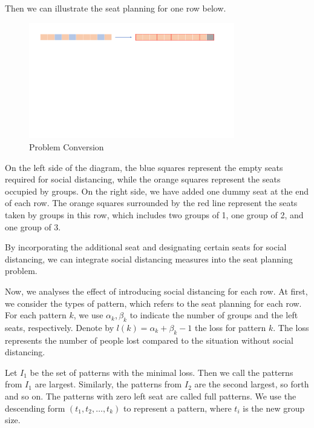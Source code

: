 Then we can illustrate the seat planning for one row below. 

\begin{figure}[ht]
    \centering
    \includegraphics[width = 0.8\textwidth]{./Figures/dummy_seat.pdf}
    \caption{Problem Conversion}
\end{figure}


On the left side of the diagram, the blue squares represent the empty seats required for social distancing, while the orange squares represent the seats occupied by groups. On the right side, we have added one dummy seat at the end of each row. The orange squares surrounded by the red line represent the seats taken by groups in this row, which includes two groups of 1, one group of 2, and one group of 3.

By incorporating the additional seat and designating certain seats for social distancing, we can integrate social distancing measures into the seat planning problem.


Now, we analyses the effect of introducing social distancing for each row. At first, we consider the types of pattern, which refers to the seat planning for each row. For each pattern $k$, we use $\alpha_k, \beta_k$ to indicate the number of groups and the left seats, respectively. Denote by $l(k) = \alpha_k + \beta_k -1$ the loss for pattern $k$. The loss represents the number of people lost compared to the situation without social distancing.

Let $I_1$ be the set of patterns with the minimal loss. Then we call the patterns from $I_1$ are largest. Similarly, the patterns from $I_2$ are the second largest, so forth and so on. The patterns with zero left seat are called full patterns. We use the descending form $(t_1, t_2, \ldots, t_k)$ to represent a pattern, where $t_i$ is the new group size. 

